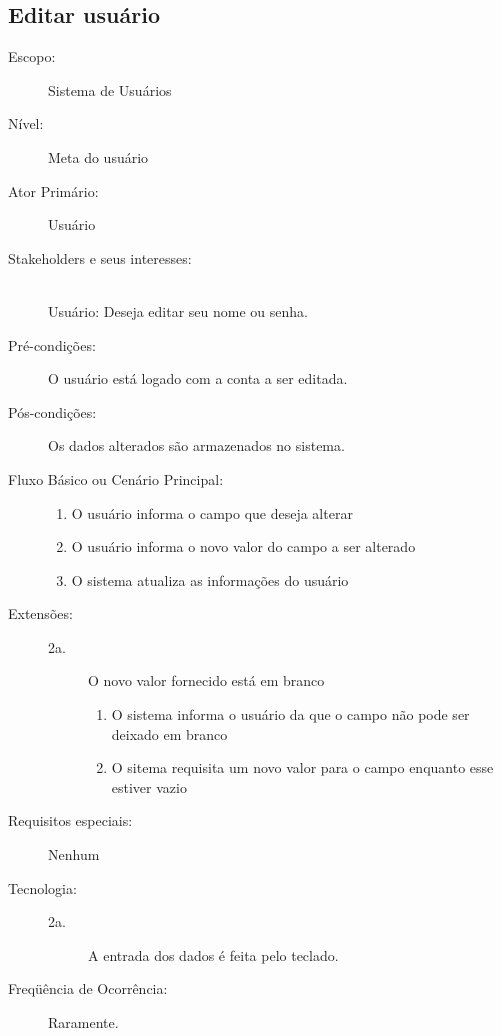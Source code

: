 \documentclass[brazil,times]{abnt}
\begin{document}
\subsection{Editar usuário}
\begin{description}
\item[Escopo:] Sistema de Usuários
\item[Nível:] Meta do usuário
\item[Ator Primário:] Usuário

\item[Stakeholders e seus interesses:] \hfill \\ 
Usuário: Deseja editar seu nome ou senha.

\item[Pré-condições:] O usuário está logado com a conta a ser editada.

\item[Pós-condições:] Os dados alterados são armazenados no sistema.

\item[Fluxo Básico ou Cenário Principal:] \hfill
\begin{enumerate}
  \item O usuário informa o campo que deseja alterar
  \item O usuário informa o novo valor do campo a ser alterado
  \item O sistema atualiza as informações do usuário

\end{enumerate}

\item[Extensões:] \hfill
\begin{description}
	\item[2a.] O novo valor fornecido está em branco
		\begin{enumerate}
 			\item O sistema informa o usuário da que o campo não pode ser deixado em
 			branco
  			\item O sitema requisita um novo valor para o campo enquanto esse estiver
  			vazio
		\end{enumerate}
\end{description}
\item[Requisitos especiais:] Nenhum

\item[Tecnologia:] \hfill
\begin{description} 
	\item[2a.] A entrada dos dados é feita pelo teclado.
\end{description}
\item[Freqüência de Ocorrência:] Raramente.

\end{description}
\end{document}
